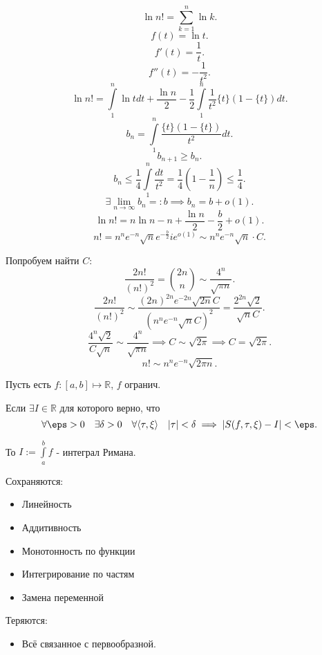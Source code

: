 \begin{example} \thmslashn

    \[ \ln n! = \sum\limits_{k=1}^{n} \ln k .\]
    \[ f(t) = \ln t .\] 
    \[ f'(t) = \frac{1}{t} .\]
    \[ f''(t) = -\frac{1}{t^2} .\]
    \[ \ln n! = \int\limits_{1}^{n} \ln t dt + \frac{\ln n}{2} - \frac{1}{2}\int\limits_{1}^{n} \frac{1}{t^2}\{t\}(1-\{t\})dt     .\]
    \[ b_n = \int\limits_{1}^{n} \frac{\{t\}(1-\{t\})  }{t^2}dt  .\]
    \[ b_{n+1} \ge b_{n} .\]
    \[ b_{n} \le \frac{1}{4}\int\limits_{1}^{n} \frac{dt}{t^2} = \frac{1}{4}(1-\frac{1}{n}) \le \frac{1}{4}  .\]
    \[ \exists{}\lim\limits_{n \to \infty} b_{n} =: b \implies b_{n} = b + o(1) .\] 
    \[ \ln n! = n\ln n - n + \frac{\ln n}{2} - \frac{b}{2} + o(1) .\] 
    \[ n! = n^{n}e^{-n}\sqrt{n}e^{-\frac{b}{2}}ie^{o(1)} \sim n^{n}e^{-n}\sqrt{n}\cdot C   .\]
    
    Попробуем найти $C$:
    \[ \frac{2n!}{(n!)^2} = \binom{2n}{n} \sim \frac{4^{n}}{\sqrt{\pi n} } .\]
    \[ \frac{2n!}{(n!)^2} \sim \frac{(2n)^{2n}e^{-2n}\sqrt{2n}C }{(n^{n}e^{-n}\sqrt{n}C )^2} = \frac{2^{2n}\sqrt{2} }{\sqrt{n}C } .\]
    \[ \frac{4^{n}\sqrt{2} }{C\sqrt{n} } \sim \frac{4^{n}}{\sqrt{\pi n} } \implies C \sim \sqrt{2\pi} \implies C = \sqrt{2\pi}    .\]
    \[ n! \sim n^{n}e^{-n}\sqrt{2\pi n}  .\] 
\end{example}
\begin{definition} \thmslashn 

    Пусть есть $f: \left[a, b\right] \mapsto \mathbb{R}$, $f$ огранич.
    
    Если $\exists{I\in \mathbb{R}}$ для которого верно, что
    \[ \forall{\eps > 0}\quad \exists{\delta > 0}\quad \forall{\left<\tau, \xi\right>}\quad |\tau| < \delta \implies |S(f, \tau, \xi) - I| < \eps  .\]

    То $I := \int\limits_{a}^{b} f $ - интеграл Римана.
\end{definition}
\begin{properties} \thmslashn
    
    Сохраняются:
    \begin{itemize}
        \item Линейность
        \item Аддитивность
        \item Монотонность по функции
        \item Интегрирование по частям
        \item Замена переменной
    \end{itemize}

    Теряются:
    \begin{itemize}
        \item Всё связанное с первообразной.
    \end{itemize}
\end{properties}

